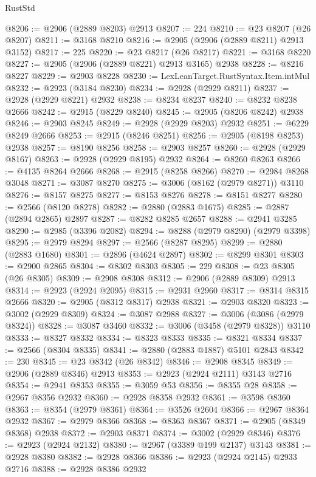 \begin{lexlean}{RustStd}
\begin{coremodule}
{\begin{coremodule}
{{{{{{{{{{{{{{{{{{{{{{{{{{{{{{{{{{{{{{{{{{{{{{{{{{{{{{{{{{{{{{{{{{{{{{{{{{{{{{@8206 := @2906 (@2889 @8203) @2913
@8207 := 224
@8210 := @23 @8207 (@26 @8207)
@8211 := @3168 @8210
@8216 := @2905 (@2906 (@2889 @8211) @2913 @3152)
@8217 := 225
@8220 := @23 @8217 (@26 @8217)
@8221 := @3168 @8220
@8227 := @2905 (@2906 (@2889 @8221) @2913 @3165) @2938
@8228 := @8216 @8227
@8229 := @2903 @8228
@8230 := LexLeanTarget.RustSyntax.Item.intMul
@8232 := @2923 (@3184 @8230)
@8234 := @2928 (@2929 @8211)
@8237 := @2928 (@2929 @8221) @2932
@8238 := @8234 @8237
@8240 := @8232 @8238 @2666
@8242 := @2915 (@8229 @8240)
@8245 := @2905 (@8206 @8242) @2938
@8246 := @2903 @8245
@8249 := @2928 (@2929 @8203) @2932
@8251 := @6229 @8249 @2666
@8253 := @2915 (@8246 @8251)
@8256 := @2905 (@8198 @8253) @2938
@8257 := @8190 @8256
@8258 := @2903 @8257
@8260 := @2928 (@2929 @8167)
@8263 := @2928 (@2929 @8195) @2932
@8264 := @8260 @8263
@8266 := @4135 @8264 @2666
@8268 := @2915 (@8258 @8266)
@8270 := @2984 @8268 @3048
@8271 := @3087 @8270
@8275 := @3006 (@8162 (@2979 @8271)) @3110
@8276 := @8157 @8275
@8277 := @8153 @8276
@8278 := @8151 @8277
@8280 := @2566 (@8120 @8278)
@8282 := @2880 (@2883 @1675)
@8285 := @2887 (@2894 @2865) @2897
@8287 := @8282 @8285 @2657
@8288 := @2941 @3285
@8290 := @2985 (@3396 @2082)
@8294 := @8288 (@2979 @8290) (@2979 @3398)
@8295 := @2979 @8294
@8297 := @2566 (@8287 @8295)
@8299 := @2880 (@2883 @1680)
@8301 := @2896 (@4624 @2897)
@8302 := @8299 @8301
@8303 := @2900 @2865
@8304 := @8302 @8303
@8305 := 229
@8308 := @23 @8305 (@26 @8305)
@8309 := @2908 @8308
@8312 := @2906 (@2889 @8309) @2913
@8314 := @2923 (@2924 @2095)
@8315 := @2931 @2960
@8317 := @8314 @8315 @2666
@8320 := @2905 (@8312 @8317) @2938
@8321 := @2903 @8320
@8323 := @3002 (@2929 @8309)
@8324 := @3087 @2988
@8327 := @3006 (@3086 (@2979 @8324))
@8328 := @3087 @3460
@8332 := @3006 (@3458 (@2979 @8328)) @3110
@8333 := @8327 @8332
@8334 := @8323 @8333
@8335 := @8321 @8334
@8337 := @2566 (@8304 @8335)
@8341 := @2880 (@2883 @1887) @5101 @2843
@8342 := 230
@8345 := @23 @8342 (@26 @8342)
@8346 := @2908 @8345
@8349 := @2906 (@2889 @8346) @2913
@8353 := @2923 (@2924 @2111) @3143 @2716
@8354 := @2941 @8353
@8355 := @3059 @53
@8356 := @8355 @28
@8358 := @2967 @8356 @2932
@8360 := @2928 @8358 @2932
@8361 := @3598 @8360
@8363 := @8354 (@2979 @8361)
@8364 := @3526 @2604
@8366 := @2967 @8364 @2932
@8367 := @2979 @8366
@8368 := @8363 @8367
@8371 := @2905 (@8349 @8368) @2938
@8372 := @2903 @8371
@8374 := @3002 (@2929 @8346)
@8376 := @2923 (@2924 @2132)
@8380 := @2967 (@3389 @199 @2137) @3143
@8381 := @2928 @8380
@8382 := @2928 @8366
@8386 := @2923 (@2924 @2145) @2933 @2716
@8388 := @2928 @8386 @2932
}}}}}}}}}}}}}}}}}}}}}}}}}}}}}}}}}}}}}}}}}}}}}}}}}}}}}}}}}}}}}}}}}}}}}}}}}}}}}}
\end{coremodule}}
\end{coremodule}
\end{lexlean}
